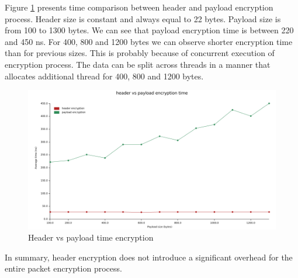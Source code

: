 Figure \ref{fig:header_payload_enc} presents time comparison between header and payload encryption process. 
Header size is constant and always equal to 22 bytes.
Payload size is from 100 to 1300 bytes.
We can see that payload encryption time is between 220 and 450 ns.
For 400, 800 and 1200 bytes we can observe shorter encryption time than for previous sizes.
This is probably because of concurrent execution of encryption process.
The data can be split across threads in a manner that allocates additional thread for 400, 800 and 1200 bytes.

\begin{figure}
    \centering
    \includegraphics[width=\textwidth]{img/header_payload_enc.png}
    \caption{Header vs payload time encryption}
    \label{fig:header_payload_enc}
\end{figure}

In summary, header encryption does not introduce a significant overhead for the entire packet encryption process.
